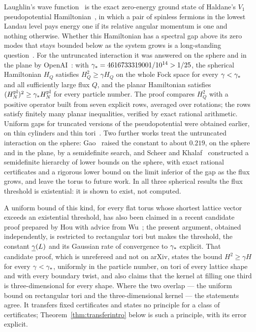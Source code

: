 Laughlin's wave function~\cite{Laughlin} is the exact zero-energy ground state of Haldane's $V_1$ pseudopotential
Hamiltonian~\cite{Haldane}, in which a pair of spinless fermions in the lowest Landau level pays energy one if its relative
angular momentum is one and nothing otherwise. Whether this Hamiltonian has a spectral gap above its zero modes that stays
bounded below as the system grows is a long-standing question~\cite[Appendix~A]{Rougerie}. For the untruncated interaction it
was answered on the sphere and in the plane by OpenAI~\cite{OAI:A-Fock-space-inequality-and-the-Laughlin-spectral-gap-September-24-2026}:
with $\gamma_{*}=4616733319001/10^{14}>1/25$, the spherical Hamiltonian $H_Q$ satisfies $H_Q^2\ge\gamma H_Q$ on the whole Fock space for every
$\gamma<\gamma_{*}$ and all sufficiently large flux $Q$, and the planar Hamiltonian satisfies $(H^{\mathrm{pl}}_N)^2\ge\gamma_{*} H^{\mathrm{pl}}_N$ for every
particle number. The proof compares $H_Q^2$ with a positive operator built from seven explicit rows, averaged over rotations; the
rows satisfy finitely many planar inequalities, verified by exact rational arithmetic. Uniform gaps for truncated versions of the
pseudopotential were obtained earlier, on thin cylinders and thin tori~\cite{NWY,WY}. Two further works treat the untruncated
interaction on the sphere: Gao~\cite{Gao} raised the constant to about $0.219$, on the sphere and in the plane, by a semidefinite
search, and Scheer and Khalaf~\cite{ScheerKhalaf} constructed a semidefinite hierarchy of lower bounds on the sphere, with exact
rational certificates and a rigorous lower bound on the limit inferior of the gap as the flux grows, and leave the torus to
future work. In all three spherical results the flux threshold is existential: it is shown to exist, not computed.

A uniform bound of this kind, for every flat torus whose shortest lattice vector exceeds an existential threshold, has also
been claimed in a recent candidate proof prepared by Hou with advice from Wu~\cite{HouWu}; the present argument, obtained
independently, is restricted to rectangular tori but makes the threshold, the constant $\underline{\gamma}(L)$ and its Gaussian rate of
convergence to $\gamma_{*}$ explicit. That candidate proof, which is unrefereed and not on arXiv, states the bound $H^2\ge\gamma H$ for
every $\gamma<\gamma_{*}$, uniformly in the particle number, on tori of every lattice shape and with every boundary twist, and also
claims that the kernel at filling one third is three-dimensional for every shape. Where the two overlap --- the uniform
bound on rectangular tori and the three-dimensional kernel --- the statements agree. It transfers fixed certificates and states
no principle for a class of certificates; Theorem~\ref{thm:transferintro} below is such a principle, with its error explicit.

